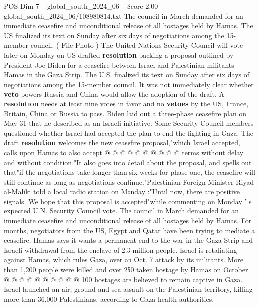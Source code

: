 \begin{textsample}{POS Dim 7 – global\_south\_2024\_06 – Score 2.00 – global\_south\_2024\_06/108980814.txt}  \label{ex:f7_pos_085}
The council in March demanded for an immediate ceasefire and unconditional release of all hostages held by Hamas.
The US finalized its text on Sunday after six days of negotiations among the 15-member council. ( File Photo ) The United Nations Security Council will vote later on Monday on US-drafted \textbf{resolution} backing a proposal outlined by President Joe Biden for a ceasefire between Israel and Palestinian militants Hamas in the Gaza Strip.
The U.S. finalized its text on Sunday after six days of negotiations among the 15-member council.
It was not immediately clear whether \textbf{veto} powers Russia and China would allow the adoption of the draft.
A \textbf{resolution} needs at least nine votes in favor and no \textbf{vetoes} by the US, France, Britain, China or Russia to pass.
Biden laid out a three-phase ceasefire plan on May 31 that he described as an Israeli initiative.
Some Security Council members questioned whether Israel had accepted the plan to end the fighting in Gaza.
The draft \textbf{resolution} welcomes the new ceasefire proposal,"which Israel accepted, calls upon Hamas to also accept @ @ @ @ @ @ @ @ @ @ terms without delay and without condition."It also goes into detail about the proposal, and spells out that"if the negotiations take longer than six weeks for phase one, the ceasefire will still continue as long as negotiations continue."Palestinian Foreign Minister Riyad al-Maliki told a local radio station on Monday :"Until now, there are positive signals.
We hope that this proposal is accepted"while commenting on Monday ' s expected U.N.
Security Council vote.
The council in March demanded for an immediate ceasefire and unconditional release of all hostages held by Hamas.
For months, negotiators from the US, Egypt and Qatar have been trying to mediate a ceasefire.
Hamas says it wants a permanent end to the war in the Gaza Strip and Israeli withdrawal from the enclave of 2.3 million people.
Israel is retaliating against Hamas, which rules Gaza, over an Oct. 7 attack by its militants.
More than 1,200 people were killed and over 250 taken hostage by Hamas on October @ @ @ @ @ @ @ @ @ @ 100 hostages are believed to remain captive in Gaza.
Israel launched an air, ground and sea assault on the Palestinian territory, killing more than 36,000 Palestinians, according to Gaza health authorities.

\end{textsample}
